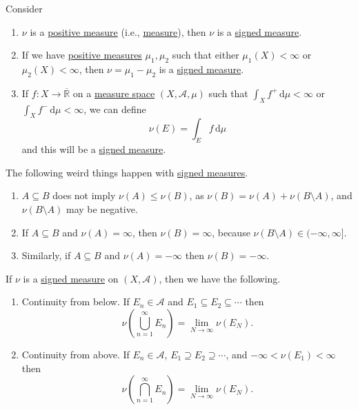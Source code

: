 \begin{eg}
	Consider
	\begin{enumerate}[(1)]
		\item \(\nu\) is a \hyperref[def:signed-measure]{positive measure} (i.e., \hyperref[def:measure]{measure}), then \(\nu\) is a \hyperref[def:signed-measure]{signed measure}.
		\item If we have \hyperref[def:signed-measure]{positive measures} \(\mu_1,\mu_2\) such that either \(\mu_1(X) < \infty\) or \(\mu_2(X) < \infty\), then \(\nu = \mu_1 - \mu_2\) is a \hyperref[def:signed-measure]{signed measure}.
		\item If \(f \colon X \to \overline{\mathbb{R}}\) on a \hyperref[def:measure-space]{measure space} \((X,\mathcal{A},\mu)\) such that \(\int_X f^+ \,\mathrm{d} \mu < \infty\) or \(\int_X f^- \,\mathrm{d} \mu < \infty\), we can define
		      \[
			      \nu(E) = \int_E f \,\mathrm{d} \mu
		      \]
		      and this will be a \hyperref[def:signed-measure]{signed measure}.
	\end{enumerate}
\end{eg}

\begin{note}
	The following weird things happen with \hyperref[def:signed-measure]{signed measures}.
	\begin{enumerate}[(1)]
		\item \(A \subseteq B\) does not imply \(\nu(A) \leq \nu(B)\), as \(\nu(B) = \nu(A) + \nu(B \setminus A)\), and \(\nu(B \setminus A)\) may be negative.
		\item If \(A \subseteq B\) and \(\nu(A) = \infty\), then \(\nu(B) = \infty\), because \(\nu(B \setminus A) \in (-\infty,\infty]\).
		\item Similarly, if \(A \subseteq B\) and \(\nu(A) = -\infty\) then \(\nu(B) = -\infty\).
	\end{enumerate}
\end{note}

\begin{lemma}\label{lemma:signed-cont-above-below}
	If \(\nu\) is a \hyperref[def:signed-measure]{signed measure} on \((X, \mathcal{A})\), then we have the following.
	\begin{enumerate}[(1)]
		\item\label{lma:signed-continuity-from-below} Continuity from below. If \(E_n \in \mathcal{A}\) and \(E_1 \subseteq E_2 \subseteq \cdots\) then
		\[
			\nu\left( \bigcup_{n=1}^\infty E_n \right)  = \lim_{N \to \infty} \nu(E_N).
		\]
		\item\label{lma:signed-continuity-from-above} Continuity from above. If \(E_n \in \mathcal{A}\), \(E_1 \supseteq E_2 \supseteq \cdots\),
		and \(-\infty < \nu(E_1) < \infty\) then
		\[
			\nu\left( \bigcap_{n=1}^\infty E_n \right)  = \lim_{N \to \infty} \nu(E_N).
		\]
	\end{enumerate}
\end{lemma}

